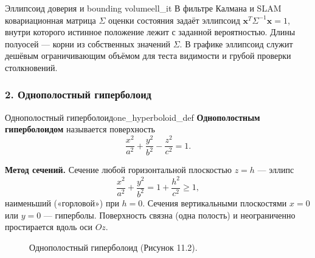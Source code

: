 \documentclass[12pt,a4paper]{article}
\begin{document}
\begin{remarkIT}{Эллипсоид доверия и bounding volume}{ell_it}
  В фильтре Калмана и SLAM ковариационная матрица $\Sigma$ оценки
  состояния задаёт эллипсоид $\mathbf{x}^T \Sigma^{-1}\mathbf{x} = 1$,
  внутри которого истинное положение лежит с заданной вероятностью.
  Длины полуосей — корни из собственных значений $\Sigma$. В графике
  эллипсоид служит дешёвым ограничивающим объёмом для теста видимости
  и грубой проверки столкновений.
\end{remarkIT}

\subsubsection*{2. Однополостный гиперболоид}

\begin{definition}{Однополостный гиперболоид}{one_hyperboloid_def}
  \textbf{Однополостным гиперболоидом} называется поверхность
  \begin{equation}
    \frac{x^2}{a^2} + \frac{y^2}{b^2} - \frac{z^2}{c^2} = 1. \tag{11.5}
  \end{equation}

  \textbf{Метод сечений.} Сечение любой горизонтальной плоскостью
  $z = h$ — эллипс
  \[
    \frac{x^2}{a^2} + \frac{y^2}{b^2} = 1 + \frac{h^2}{c^2} \ge 1,
  \]
  наименьший («горловой») при $h = 0$. Сечения вертикальными
  плоскостями $x = 0$ или $y = 0$ — гиперболы. Поверхность связна
  (одна полость) и неограниченно простирается вдоль оси $Oz$.
\end{definition}

\begin{figure}[h!]
  \centering
  \caption{Однополостный гиперболоид (Рисунок 11.2).}
  \label{fig:one_hyperboloid}
\end{figure}
\end{document}
